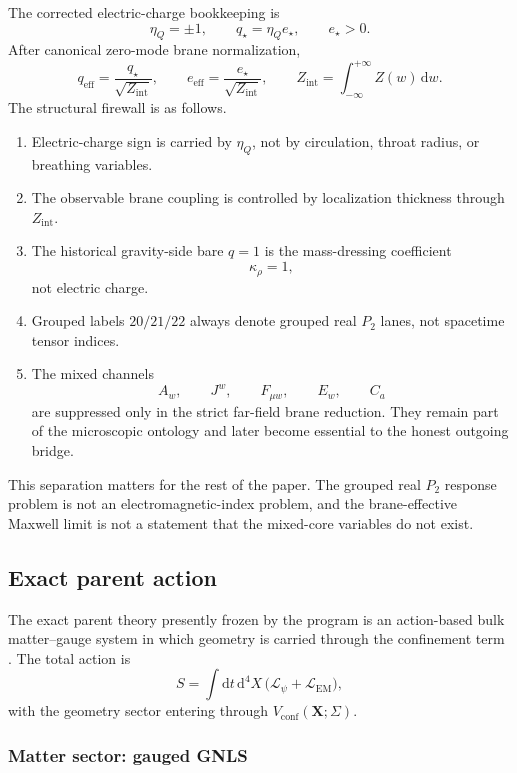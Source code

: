 \documentclass[11pt]{article}
\theoremstyle{definition}
\begin{document}
The corrected electric-charge bookkeeping is
\[
\eta_Q=\pm 1,
\qquad
q_\star=\eta_Q e_\star,
\qquad
e_\star>0.
\]
After canonical zero-mode brane normalization,
\[
q_{\mathrm{eff}}=\frac{q_\star}{\sqrt{Z_{\mathrm{int}}}},
\qquad
e_{\mathrm{eff}}=\frac{e_\star}{\sqrt{Z_{\mathrm{int}}}},
\qquad
Z_{\mathrm{int}}=\int_{-\infty}^{+\infty} Z(w)\,\mathrm dw.
\]
The structural firewall is as follows.
\begin{enumerate}
    \item Electric-charge sign is carried by \(\eta_Q\), not by circulation, throat radius, or breathing variables.
    \item The observable brane coupling is controlled by localization thickness through \(Z_{\mathrm{int}}\).
    \item The historical gravity-side bare \(q=1\) is the mass-dressing coefficient
    \[
    \kappa_\rho=1,
    \]
    not electric charge.
    \item Grouped labels \(20/21/22\) always denote grouped real \(P_2\) lanes, not spacetime tensor indices.
    \item The mixed channels
    \[
    A_w,\qquad J^w,\qquad F_{\mu w},\qquad E_w,\qquad C_a
    \]
    are suppressed only in the strict far-field brane reduction. They remain part of the microscopic ontology and later become essential to the honest outgoing bridge.
\end{enumerate}

This separation matters for the rest of the paper. The grouped real \(P_2\) response problem is not an electromagnetic-index problem, and the brane-effective Maxwell limit is not a statement that the mixed-core variables do not exist.

\subsection{Exact parent action}

The exact parent theory presently frozen by the program is an action-based bulk matter--gauge system in which geometry is carried through the confinement term \cite{Norris2026Parent4D,Norris2026Maxwell4D}. The total action is
\[
S=\int \mathrm dt\,\mathrm d^4X\,\bigl(\mathcal L_\psi+\mathcal L_{\mathrm{EM}}\bigr),
\]
with the geometry sector entering through \(V_{\mathrm{conf}}(\mathbf X;\Sigma)\).

\subsubsection*{Matter sector: gauged GNLS}
\end{document}
